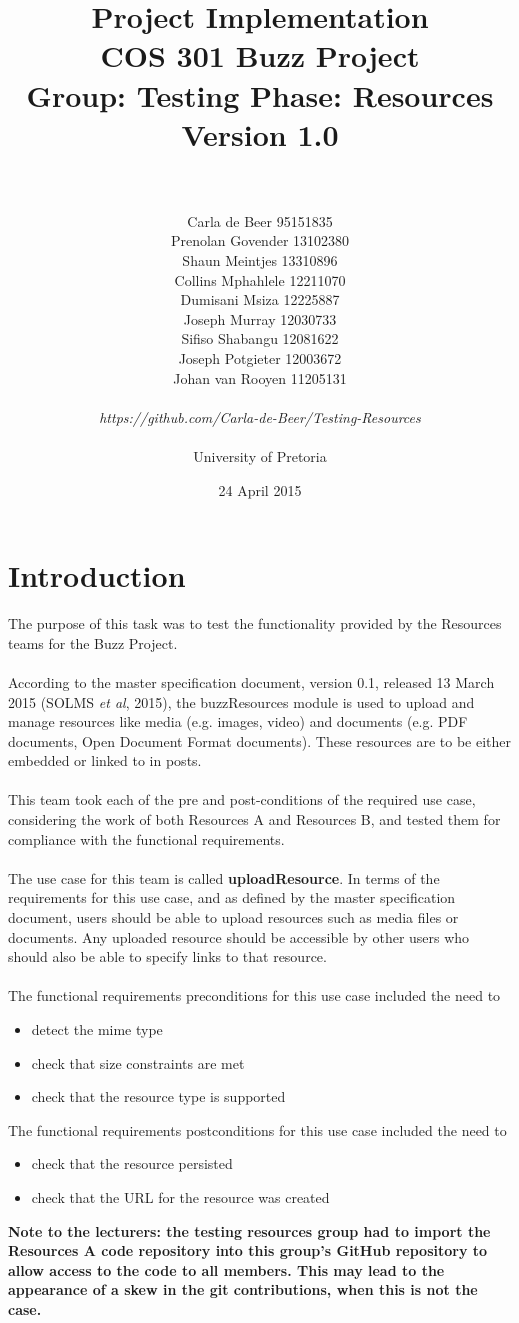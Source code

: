 \documentclass[a4paper]{article}
\title{Project Implementation
\\COS 301 Buzz Project
\\Group: Testing Phase: Resources
\\Version 1.0}
\author{
\\
\\Carla de Beer 95151835
\\Prenolan Govender 13102380
\\Shaun Meintjes 13310896
\\Collins Mphahlele 12211070
\\Dumisani Msiza 12225887
\\Joseph Murray 12030733
\\Sifiso Shabangu 12081622
\\Joseph Potgieter 12003672
\\Johan van Rooyen 11205131
\\
\\
\textit{https://github.com/Carla-de-Beer/Testing-Resources}
\\
\\ University of Pretoria}
\date{24 April 2015}
\begin{document}
\maketitle
\newpage


\tableofcontents
\newpage

\section{Introduction}

The purpose of this task was to test the functionality provided by the Resources teams for the Buzz Project.
\\
\\
According to the master specification document, version 0.1, released 13 March 2015 (SOLMS \textit{et al}, 2015), the buzzResources module is used to upload and manage resources like media (e.g. images, video) and documents (e.g. PDF documents, Open Document Format documents). These resources are to be either embedded or linked to in posts.
\\
\\
This team took each of the pre and post-conditions of the required use case, considering the work of both Resources A and Resources B, and tested them for compliance with the functional requirements. 
\\
\\The use case for this team is called \textbf{uploadResource}. In terms of the requirements for this use case, and as defined by the master specification document, users should be able to upload resources such as media files or documents. Any uploaded resource should be accessible by other users who should also be able to specify links to that resource. 
\\
\\The functional requirements preconditions for this use case included the need to
\begin{itemize}
\item detect the mime type
\item check that size constraints are met
\item check that the resource type is supported
\end{itemize}
The functional requirements postconditions for this use case included the need to
\begin{itemize}
\item check that the resource persisted
\item check that the URL for the resource was created
\end{itemize}
\textbf{Note to the lecturers: the testing resources group had to import the Resources A code repository into this group's GitHub repository to allow access to the code to all members. This may lead to the appearance of a skew in the git contributions, when this is not the case.}
\end{document}
